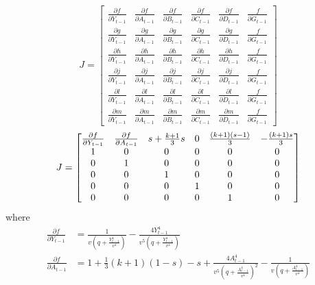\begin{equation*}
J = \begin{bmatrix}
    \frac{\partial f}{\partial \dot Y_{t-1}} & \frac{\partial f}{\partial \dot A_{t-1}} & \frac{\partial f}{\partial \dot B_{t-1}} & \frac{\partial f}{\partial \dot C_{t-1}} & \frac{\partial f}{\partial \dot D_{t-1}} & \frac{\ f}{\partial \dot G_{t-1}}\\
    \frac{\partial g}{\partial \dot Y_{t-1}} & \frac{\partial g}{\partial \dot A_{t-1}} & \frac{\partial g}{\partial \dot B_{t-1}} & \frac{\partial g}{\partial \dot C_{t-1}} & \frac{\partial g}{\partial \dot D_{t-1}} & \frac{\ f}{\partial \dot G_{t-1}}\\
    \frac{\partial h}{\partial \dot Y_{t-1}} & \frac{\partial h}{\partial \dot A_{t-1}} & \frac{\partial h}{\partial \dot B_{t-1}} & \frac{\partial h}{\partial \dot C_{t-1}} & \frac{\partial h}{\partial \dot D_{t-1}} & \frac{\ f}{\partial \dot G_{t-1}}\\
    \frac{\partial j}{\partial \dot Y_{t-1}} & \frac{\partial j}{\partial \dot A_{t-1}} & \frac{\partial j}{\partial \dot B_{t-1}} & \frac{\partial j}{\partial \dot C_{t-1}} & \frac{\partial j}{\partial \dot D_{t-1}} & \frac{\ f}{\partial \dot G_{t-1}}\\
    \frac{\partial l}{\partial \dot Y_{t-1}} & \frac{\partial l}{\partial \dot A_{t-1}} & \frac{\partial l}{\partial \dot B_{t-1}} & \frac{\partial l}{\partial \dot C_{t-1}} & \frac{\partial l}{\partial \dot D_{t-1}} & \frac{\ f}{\partial \dot G_{t-1}}\\
    \frac{\partial m}{\partial \dot Y_{t-1}} & \frac{\partial m}{\partial \dot A_{t-1}} & \frac{\partial m}{\partial \dot B_{t-1}} & \frac{\partial m}{\partial \dot C_{t-1}} & \frac{\partial m}{\partial \dot D_{t-1}} & \frac{\ f}{\partial \dot G_{t-1}}
\end{bmatrix}
\end{equation*}
\begin{equation}
J=
\begin{bmatrix}\small
    \frac{\partial f}{\partial Y_{t-1}} & \frac{\partial f}{\partial A_{t-1}} & s+\frac{k+1}{3}s & 0 & \frac{(k+1)(s-1)}{3} & -\frac{(k+1)s}{3}\\
    1 & 0 & 0 & 0 & 0 & 0\\
    0 & 1 & 0 & 0 & 0 & 0\\
    0 & 0 & 1 & 0 & 0 & 0\\
    0 & 0 & 0 & 1 & 0 & 0\\
    0 & 0 & 0 & 0 & 1 & 0
\end{bmatrix}
\end{equation}
where 
\begin{align*}
    \frac{\partial f}{\partial Y_{t-1}}&= \frac{1}{v\left(q+\frac{Y_{t-1}^4}{v^4}\right)}-\frac{4Y_{t-1}^4}{v^5\left(q+\frac{Y_{t-1}^4}{v^4}\right)}\\
    \frac{\partial f}{\partial A_{t-1}}&=1+\frac{1}{3}(k+1)(1-s)-s+\frac{4A_{t-1}^4}{v^5\left(q+\frac{A_{t-1}^4}{v^4}\right)^2}-\frac{1}{v\left(q+\frac{A_{t-1}^4}{v^4}\right)}
\end{align*}

